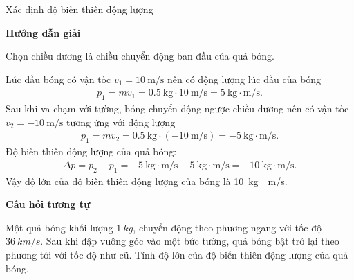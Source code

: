 \begin{dang}{Xác định độ biến thiên động lượng}
	{	\begin{center}
			\textbf{Hướng dẫn giải}
		\end{center}
		Chọn chiều dương là chiều chuyển động ban đầu của quả bóng. 
		
		Lúc đầu bóng có vận tốc $v_1=\SI{10}{\meter/\second}$ nên có động lượng lúc đầu của bóng 
		\begin{align*}
			p_1=mv_1=\SI{0.5}{\kilogram}\cdot\SI{10}{\meter/\second}=\SI{5}{\kilogram\cdot\meter/\second}.
		\end{align*} 
		Sau khi va chạm với tường, bóng chuyển động ngược chiều dương nên có vận tốc $v_2=\SI{-10}{\meter/\second}$ tương ứng với động lượng 
		\begin{align*}
			p_1=mv_2=\SI{0.5}{\kilogram}\cdot\left(\SI{-10}{\meter/\second}\right)=\SI{-5}{\kilogram\cdot\meter/\second}.
		\end{align*}
		Độ biến thiên động lượng của quả bóng:
		\begin{align*}
			\Delta p=p_2-p_1=\SI{-5}{\kilogram\cdot\meter/\second}-\SI{5}{\kilogram\cdot\meter/\second}=\SI{-10}{\kilogram\cdot\meter/\second}.
		\end{align*}
		Vậy độ lớn của độ biên thiên động lượng của bóng là \SI{10}{\kilogram \cdot\meter/\second}.
		
		
		\begin{center}
			\textbf{Câu hỏi tương tự}
		\end{center}
		
		Một quả bóng khối lượng $\SI{1}{kg}$, chuyển động theo phương ngang với tốc độ $\SI{36}{km/s}$. Sau khi đập vuông góc vào một bức tường, quả bóng bật trở lại theo phương tới với tốc độ như cũ. Tính độ lớn của độ biến thiên động lượng của quả bóng.
		
}
\end{dang}
